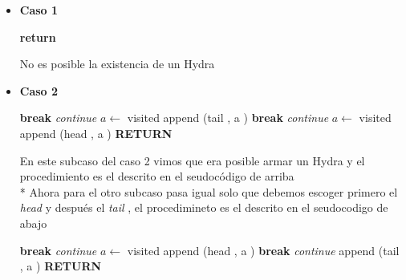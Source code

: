 \documentclass[12pt]{article}
\begin{document}
    \begin{itemize}
        \item \textbf{Caso 1} 
        \begin{algorithmic}
                \State \textbf{return} 
            \EndIf 
        \end{algorithmic}
        No es posible la existencia de un Hydra 

        \item \textbf{Caso 2}
        
        \begin{algorithmic}
                        \State \textbf{break} 
                    \EndIf
                        \State \textit{continue}
                    \EndIf 
                    \State $a \leftarrow $ visited 
                    \State append (tail , a ) 
                \EndFor 
                        \State\textbf{break}
                    \EndIf
                        \State \textit{continue} 
                    \EndIf 
                    \State $a \leftarrow $ visited 
                    \State append (head , a ) 
                \EndFor 
                \State \textbf{RETURN}
            \EndIf
        \end{algorithmic}

        En este subcaso del caso 2 vimos que era posible armar un Hydra y el procedimiento es el descrito en el seudoc\'odigo de arriba 
        \\*
        Ahora para el otro subcaso pasa igual solo que debemos escoger primero el \textit{head} y despu\'es el \textit{tail} , el procedimineto 
        es el descrito en el seudocodigo de abajo  
        \vspace{0.5cm}
        \begin{algorithmic}
                        \State \textbf{break} 
                    \EndIf
                        \State \textit{continue}
                    \EndIf 
                    \State $a \leftarrow $ visited 
                    \State append (head , a ) 
                \EndFor 
                        \State \textbf{break} 
                    \EndIf
                        \State \textit{continue}
                    \EndIf 
                    \State append (tail , a ) 
                \EndFor 
                \State \textbf{RETURN}
            \EndIf 
        \end{algorithmic}


\end{itemize}
\end{document}
